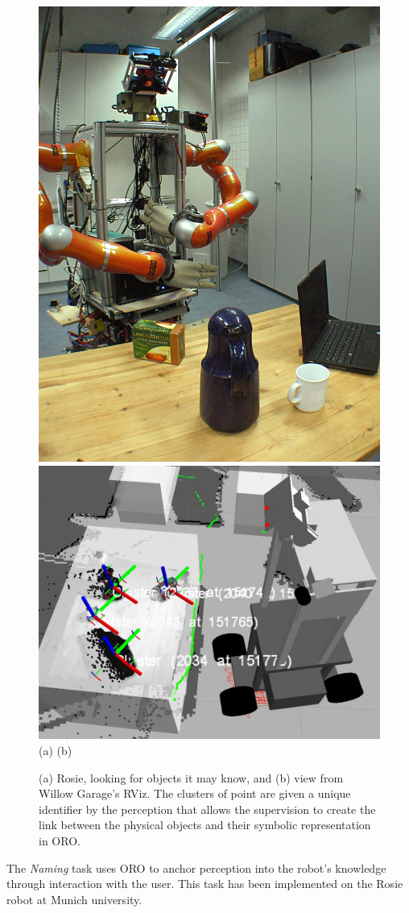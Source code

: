 \documentclass[twocolumn]{svjour3}
\begin{document}
\begin{figure}
\centering
\includegraphics[width=0.45\columnwidth]{images/kimp1.jpg}
\includegraphics[width=0.45\columnwidth]{images/rviz.png}
\flushleft
\hspace{1.8cm} (a) \hspace{3.9cm} (b)
\caption{(a) Rosie, looking for objects it may know, and (b) view from Willow
Garage's RViz. The clusters of point are given a unique identifier by the
perception that allows the supervision to create the link between the physical
objects and their symbolic representation in ORO.} 
\label{fig|kimpwatching}
\end{figure}

The \emph{Naming} task uses ORO to anchor perception into the robot's knowledge
through interaction with the user. This task has been implemented on the Rosie
robot at Munich university.
\end{document}
